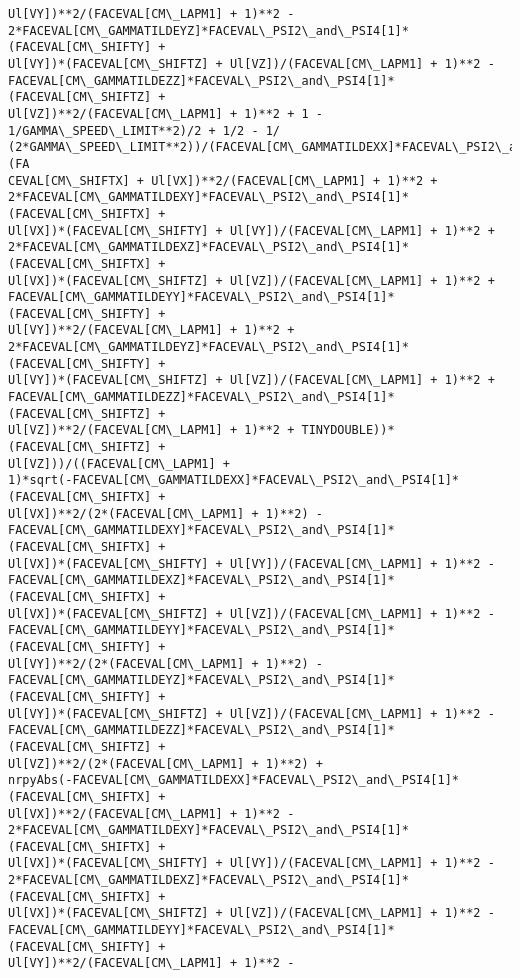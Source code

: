\documentclass[landscape,letterpaper,10pt,english]{article}
\begin{document}
\begin{Verbatim}[commandchars=\\\{\}]
Ul[VY])**2/(FACEVAL[CM\_LAPM1] + 1)**2 -
2*FACEVAL[CM\_GAMMATILDEYZ]*FACEVAL\_PSI2\_and\_PSI4[1]*(FACEVAL[CM\_SHIFTY] +
Ul[VY])*(FACEVAL[CM\_SHIFTZ] + Ul[VZ])/(FACEVAL[CM\_LAPM1] + 1)**2 -
FACEVAL[CM\_GAMMATILDEZZ]*FACEVAL\_PSI2\_and\_PSI4[1]*(FACEVAL[CM\_SHIFTZ] +
Ul[VZ])**2/(FACEVAL[CM\_LAPM1] + 1)**2 + 1 - 1/GAMMA\_SPEED\_LIMIT**2)/2 + 1/2 - 1/
(2*GAMMA\_SPEED\_LIMIT**2))/(FACEVAL[CM\_GAMMATILDEXX]*FACEVAL\_PSI2\_and\_PSI4[1]*(FA
CEVAL[CM\_SHIFTX] + Ul[VX])**2/(FACEVAL[CM\_LAPM1] + 1)**2 +
2*FACEVAL[CM\_GAMMATILDEXY]*FACEVAL\_PSI2\_and\_PSI4[1]*(FACEVAL[CM\_SHIFTX] +
Ul[VX])*(FACEVAL[CM\_SHIFTY] + Ul[VY])/(FACEVAL[CM\_LAPM1] + 1)**2 +
2*FACEVAL[CM\_GAMMATILDEXZ]*FACEVAL\_PSI2\_and\_PSI4[1]*(FACEVAL[CM\_SHIFTX] +
Ul[VX])*(FACEVAL[CM\_SHIFTZ] + Ul[VZ])/(FACEVAL[CM\_LAPM1] + 1)**2 +
FACEVAL[CM\_GAMMATILDEYY]*FACEVAL\_PSI2\_and\_PSI4[1]*(FACEVAL[CM\_SHIFTY] +
Ul[VY])**2/(FACEVAL[CM\_LAPM1] + 1)**2 +
2*FACEVAL[CM\_GAMMATILDEYZ]*FACEVAL\_PSI2\_and\_PSI4[1]*(FACEVAL[CM\_SHIFTY] +
Ul[VY])*(FACEVAL[CM\_SHIFTZ] + Ul[VZ])/(FACEVAL[CM\_LAPM1] + 1)**2 +
FACEVAL[CM\_GAMMATILDEZZ]*FACEVAL\_PSI2\_and\_PSI4[1]*(FACEVAL[CM\_SHIFTZ] +
Ul[VZ])**2/(FACEVAL[CM\_LAPM1] + 1)**2 + TINYDOUBLE))*(FACEVAL[CM\_SHIFTZ] +
Ul[VZ]))/((FACEVAL[CM\_LAPM1] +
1)*sqrt(-FACEVAL[CM\_GAMMATILDEXX]*FACEVAL\_PSI2\_and\_PSI4[1]*(FACEVAL[CM\_SHIFTX] +
Ul[VX])**2/(2*(FACEVAL[CM\_LAPM1] + 1)**2) -
FACEVAL[CM\_GAMMATILDEXY]*FACEVAL\_PSI2\_and\_PSI4[1]*(FACEVAL[CM\_SHIFTX] +
Ul[VX])*(FACEVAL[CM\_SHIFTY] + Ul[VY])/(FACEVAL[CM\_LAPM1] + 1)**2 -
FACEVAL[CM\_GAMMATILDEXZ]*FACEVAL\_PSI2\_and\_PSI4[1]*(FACEVAL[CM\_SHIFTX] +
Ul[VX])*(FACEVAL[CM\_SHIFTZ] + Ul[VZ])/(FACEVAL[CM\_LAPM1] + 1)**2 -
FACEVAL[CM\_GAMMATILDEYY]*FACEVAL\_PSI2\_and\_PSI4[1]*(FACEVAL[CM\_SHIFTY] +
Ul[VY])**2/(2*(FACEVAL[CM\_LAPM1] + 1)**2) -
FACEVAL[CM\_GAMMATILDEYZ]*FACEVAL\_PSI2\_and\_PSI4[1]*(FACEVAL[CM\_SHIFTY] +
Ul[VY])*(FACEVAL[CM\_SHIFTZ] + Ul[VZ])/(FACEVAL[CM\_LAPM1] + 1)**2 -
FACEVAL[CM\_GAMMATILDEZZ]*FACEVAL\_PSI2\_and\_PSI4[1]*(FACEVAL[CM\_SHIFTZ] +
Ul[VZ])**2/(2*(FACEVAL[CM\_LAPM1] + 1)**2) +
nrpyAbs(-FACEVAL[CM\_GAMMATILDEXX]*FACEVAL\_PSI2\_and\_PSI4[1]*(FACEVAL[CM\_SHIFTX] +
Ul[VX])**2/(FACEVAL[CM\_LAPM1] + 1)**2 -
2*FACEVAL[CM\_GAMMATILDEXY]*FACEVAL\_PSI2\_and\_PSI4[1]*(FACEVAL[CM\_SHIFTX] +
Ul[VX])*(FACEVAL[CM\_SHIFTY] + Ul[VY])/(FACEVAL[CM\_LAPM1] + 1)**2 -
2*FACEVAL[CM\_GAMMATILDEXZ]*FACEVAL\_PSI2\_and\_PSI4[1]*(FACEVAL[CM\_SHIFTX] +
Ul[VX])*(FACEVAL[CM\_SHIFTZ] + Ul[VZ])/(FACEVAL[CM\_LAPM1] + 1)**2 -
FACEVAL[CM\_GAMMATILDEYY]*FACEVAL\_PSI2\_and\_PSI4[1]*(FACEVAL[CM\_SHIFTY] +
Ul[VY])**2/(FACEVAL[CM\_LAPM1] + 1)**2 -

\end{Verbatim}
\end{document}
